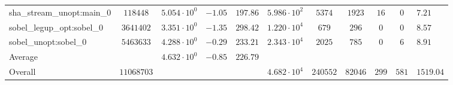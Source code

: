 \begin{tabular}{|l|c|HHc|c|c|c|c|cH|}
sha\_stream\_unopt:main\_0                      & $ 118448   $ & $ 5.054 \cdot 10^{0} $ & $ -1.05 $ & $ 197.86 $ & $ 5.986 \cdot 10^{2}  $ & $ 5374   $ & $ 1923  $ & $ 16  $ & $ 0   $ & $ 7.21    $ \\
sobel\_legup\_opt:sobel\_0                      & $ 3641402  $ & $ 3.351 \cdot 10^{0} $ & $ -1.35 $ & $ 298.42 $ & $ 1.220 \cdot 10^{4}  $ & $ 679    $ & $ 296   $ & $ 0   $ & $ 0   $ & $ 8.57    $ \\
sobel\_unopt:sobel\_0                           & $ 5463633  $ & $ 4.288 \cdot 10^{0} $ & $ -0.29 $ & $ 233.21 $ & $ 2.343 \cdot 10^{4}  $ & $ 2025   $ & $ 785   $ & $ 0   $ & $ 6   $ & $ 8.91    $ \\
\hline
Average                                         & $          $ & $ 4.632 \cdot 10^{0} $ & $ -0.85 $ & $ 226.79 $ & $                     $ & $        $ & $       $ & $     $ & $     $ & $         $ \\
\hline
Overall                                         & $ 11068703 $ & $                    $ & $       $ & $        $ & $ 4.682 \cdot 10^{4}  $ & $ 240552 $ & $ 82046 $ & $ 299 $ & $ 581 $ & $ 1519.04 $ \\
\hline
\end{tabular}
